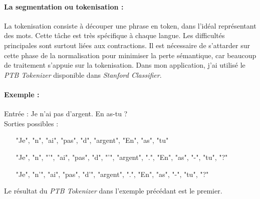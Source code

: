                 \paragraph{La segmentation ou tokenisation :}
                    La tokenisation consiste à découper une phrase en token, dans l'idéal représentant des mots. Cette tâche est très spécifique à chaque langue. Les difficultés principales sont surtout liées aux contractions. Il est nécessaire de s'attarder sur cette phase de la normalisation pour minimiser la perte sémantique, car beaucoup de traitement s'appuie sur la tokenisation. Dans mon application, j'ai utilisé le \textit{PTB Tokenizer} disponible dans \textit{Stanford Classifier}.

                    \paragraph{Exemple :}
                    Entrée : \og Je n'ai pas d'argent. En as-tu ? \fg\\
                    Sorties possibles :
                    \begin{itemize}
                        \item ["Je", "n", "ai", "pas", "d", "argent", "En", "as", "tu"]
                        \item ["Je", "n", "'", "ai", "pas", "d", "'", "argent", ".", "En", "as", "-", "tu", "?"]
                        \item ["Je", "n'", "ai", "pas", "d'", "argent", ".", "En", "as", "-", "tu", "?"]
                    \end{itemize}
                    Le résultat du \textit{PTB Tokenizer} dans l'exemple précédant est le premier.

